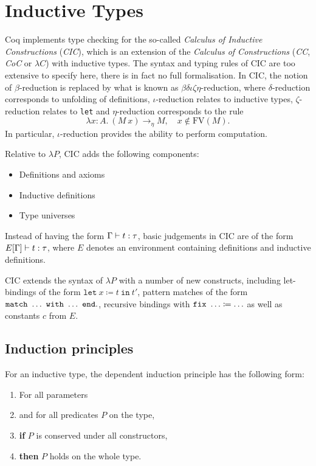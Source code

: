 \section{Inductive Types}
Coq implements type checking for the so-called \emph{Calculus of Inductive Constructions} (\emph{CIC}),
which is an extension of the \emph{Calculus of Constructions} (\emph{CC}, \emph{CoC} or $\lambda C$)
with inductive types.
The syntax and typing rules of CIC are too extensive to specify here, there is in fact no full formalisation.
In CIC, the notion of $\beta$-reduction is replaced by what is known as $\beta\delta\iota\zeta\eta$-reduction,
where $\delta$-reduction corresponds to unfolding of definitions, $\iota$-reduction relates to inductive types,
$\zeta$-reduction relates to \verb|let| and $\eta$-reduction corresponds to the rule
\[ \lambda x : A.\ (M\ x) \to_\eta M,\quad x \notin \text{FV}(M) .\]
%
In particular, $\iota$-reduction provides the ability to perform computation.

Relative to $\lambda P$, CIC adds the following components:
\begin{itemize}
    \item Definitions and axioms
    \item Inductive definitions
    \item Type universes
\end{itemize}

Instead of having the form $\Gamma \vdash t : \tau$, basic judgements in CIC are of the form
$E[\Gamma] \vdash t : \tau$, where $E$ denotes an environment containing definitions and inductive definitions.

CIC extends the syntax of $\lambda P$ with a number of new constructs, including let-bindings of the form
$\texttt{let}\ x \coloneqq t\ \texttt{in}\ t'$,
pattern matches of the form $\verb|match|\ \hdots\ \verb|with|\ \hdots\ \verb|end|.$,
recursive bindings with $\verb|fix|\ \hdots \coloneqq \hdots$ as well as
constants $c$ from $E$.


\subsection{Induction principles}
For an inductive type, the dependent induction principle has the following form:
\begin{enumerate}
    \item For all parameters
    \item and for all predicates $P$ on the type,
    \item \textbf{if} $P$ is conserved under all constructors,
    \item \textbf{then} $P$ holds on the whole type.
\end{enumerate}

